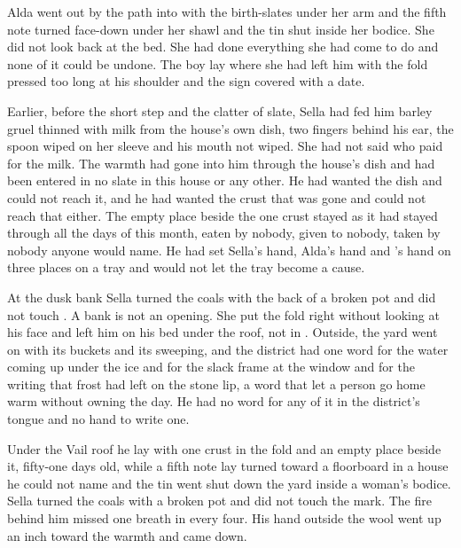 Alda went out by the path into  with the birth-slates under her arm and the fifth note turned face-down under her shawl and the tin shut inside her bodice. She did not look back at the bed. She had done everything she had come to do and none of it could be undone. The boy lay where she had left him with the fold pressed too long at his shoulder and the sign covered with a date.

Earlier, before the short step and the clatter of slate, Sella had fed him barley gruel thinned with milk from the house's own dish, two fingers behind his ear, the spoon wiped on her sleeve and his mouth not wiped. She had not said who paid for the milk. The warmth had gone into him through the house's dish and had been entered in no slate in this house or any other. He had wanted the dish and could not reach it, and he had wanted the crust that was gone and could not reach that either. The empty place beside the one crust stayed as it had stayed through all the days of this month, eaten by nobody, given to nobody, taken by nobody anyone would name. He had set Sella's hand, Alda's hand and 's hand on three places on a tray and would not let the tray become a cause.

At the dusk bank Sella turned the coals with the back of a broken pot and did not touch . A bank is not an opening. She put the fold right without looking at his face and left him on his bed under the roof, not in . Outside, the yard went on with its buckets and its sweeping, and the district had one word for the water coming up under the ice and for the slack frame at the window and for the writing that frost had left on the stone lip, a word that let a person go home warm without owning the day. He had no word for any of it in the district's tongue and no hand to write one.

Under the Vail roof he lay with one crust in the fold and an empty place beside it, fifty-one days old, while a fifth note lay turned toward a floorboard in a house he could not name and the tin went shut down the yard inside a woman's bodice. Sella turned the coals with a broken pot and did not touch the mark. The fire behind him missed one breath in every four. His hand outside the wool went up an inch toward the warmth and came down.
